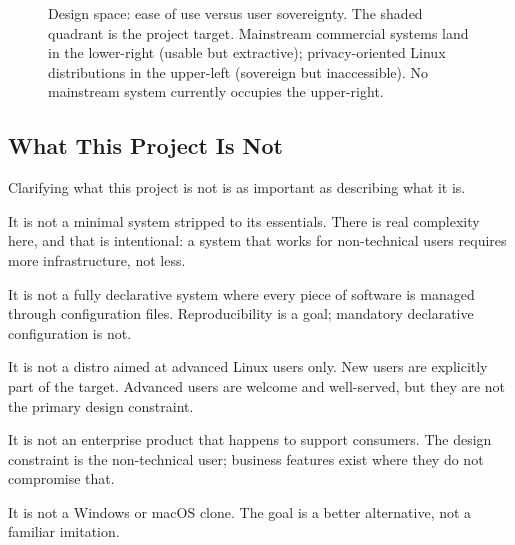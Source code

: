 \begin{figure}[htbp]
\centering
{}
\caption{Design space: ease of use versus user sovereignty. The shaded quadrant
is the project target. Mainstream commercial systems land in the lower-right
(usable but extractive); privacy-oriented Linux distributions in the upper-left
(sovereign but inaccessible). No mainstream system currently occupies the
upper-right.}
\label{fig:positioning}
\end{figure}

\subsection{What This Project Is Not}
\label{sec:nongoals}

Clarifying what this project is not is as important as describing what it is.

It is not a minimal system stripped to its essentials. There is real complexity
here, and that is intentional: a system that works for non-technical users
requires more infrastructure, not less.

It is not a fully declarative system where every piece of software is managed
through configuration files. Reproducibility is a goal; mandatory declarative
configuration is not.

It is not a distro aimed at advanced Linux users only. New users are explicitly
part of the target. Advanced users are welcome and well-served, but they are not
the primary design constraint.

It is not an enterprise product that happens to support consumers. The
design constraint is the non-technical user; business features exist where
they do not compromise that.

It is not a Windows or macOS clone. The goal is a better alternative, not a
familiar imitation.

